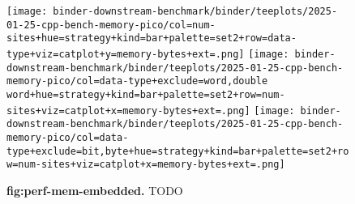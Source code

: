\begin{figure}
\centering
\texttt{[image: binder-downstream-benchmark/binder/teeplots/2025-01-25-cpp-bench-memory-pico/col=num-sites+hue=strategy+kind=bar+palette=set2+row=data-type+viz=catplot+y=memory-bytes+ext=.png]}
\texttt{[image: binder-downstream-benchmark/binder/teeplots/2025-01-25-cpp-bench-memory-pico/col=data-type+exclude=word,double word+hue=strategy+kind=bar+palette=set2+row=num-sites+viz=catplot+x=memory-bytes+ext=.png]}
\texttt{[image: binder-downstream-benchmark/binder/teeplots/2025-01-25-cpp-bench-memory-pico/col=data-type+exclude=bit,byte+hue=strategy+kind=bar+palette=set2+row=num-sites+viz=catplot+x=memory-bytes+ext=.png]}
\caption{
\textbf{fig:perf-mem-embedded.}
\footnotesize
TODO
}
\label{fig:perf-mem-embedded}
\end{figure}
